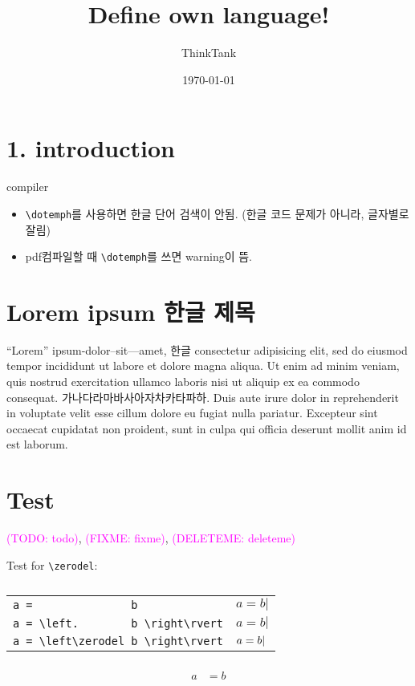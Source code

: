 \documentclass[a4paper]{article}
\newcommand*{\zerodel}{.\kern-\nulldelimiterspace}
\newcommand{\todo}[2][TODO]{\textcolor{Magenta}{\textsf{(#1: #2)}}}
\begin{document}
\title{Define own language!}
\author{ThinkTank}
\date{\today}
\maketitle


\section{1. introduction}

compiler\break 

\begin{itemize}

  \item \verb+\dotemph+를 사용하면 한글 단어 검색이 안됨.
  (한글 코드 문제가 아니라, 글자별로 잘림)
  \item pdf 컴파일할 때 \verb+\dotemph+를 쓰면 warning이 뜸.
\end{itemize}


\section{Lorem ipsum 한글 제목}

``Lorem'' ipsum-dolor--sit---amet, 한글 consectetur adipisicing elit, sed do eiusmod tempor incididunt ut labore et dolore magna aliqua.
Ut enim ad minim veniam, quis nostrud exercitation ullamco laboris nisi ut aliquip ex ea commodo consequat.
가나다라\textsf{마바사}아자차카타파하.
Duis aute irure dolor in reprehenderit in voluptate velit esse cillum dolore eu fugiat nulla pariatur.
Excepteur sint occaecat cupidatat non proident, sunt in culpa qui officia deserunt mollit anim id est laborum.


\section{Test}
\todo{todo}, \todo[FIXME]{fixme}, \todo[DELETEME]{deleteme}

Test for \verb+\zerodel+:
\begin{table}[htp]
  \centering
  \begin{tabular}{ll}
  \toprule
  \verb+a =               b+
  & $a = b \rvert$
  \\
  \verb+a = \left.        b \right\rvert+
  & $a = \left. b \right\rvert$
  \\
  \verb+a = \left\zerodel b \right\rvert+
  & $a = \left\zerodel b \right\rvert$
  \\ \bottomrule
  \end{tabular}
  \caption{}
\end{table}

\begin{align*}
   \\
  a &= b
\end{align*}
\end{document}
